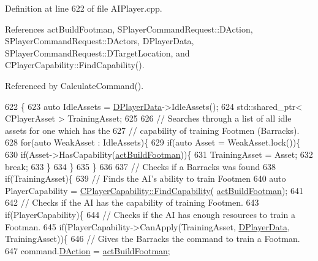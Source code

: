 Definition at line 622 of file A\+I\+Player.\+cpp.



References act\+Build\+Footman, S\+Player\+Command\+Request\+::\+D\+Action, S\+Player\+Command\+Request\+::\+D\+Actors, D\+Player\+Data, S\+Player\+Command\+Request\+::\+D\+Target\+Location, and C\+Player\+Capability\+::\+Find\+Capability().



Referenced by Calculate\+Command().


\begin{DoxyCode}
622                                                           \{
623     \textcolor{keyword}{auto} IdleAssets = \hyperlink{classCAIPlayer_a83b5113c8f7e80df54940b647c5ee2e6}{DPlayerData}->IdleAssets();
624     std::shared\_ptr< CPlayerAsset > TrainingAsset;
625     
626     \textcolor{comment}{// Searches through a list of all idle assets for one which has the }
627     \textcolor{comment}{// capability of training Footmen (Barracks).}
628     \textcolor{keywordflow}{for}(\textcolor{keyword}{auto} WeakAsset : IdleAssets)\{
629         \textcolor{keywordflow}{if}(\textcolor{keyword}{auto} Asset = WeakAsset.lock())\{
630             \textcolor{keywordflow}{if}(Asset->HasCapability(\hyperlink{GameDataTypes_8h_a35b98ce26aca678b03c6f9f76e4778cea48885d6af1b7c05c5887978f88556662}{actBuildFootman}))\{
631                 TrainingAsset = Asset;
632                 \textcolor{keywordflow}{break};
633             \}
634         \}
635     \}
636 
637     \textcolor{comment}{// Checks if a Barracks was found}
638     \textcolor{keywordflow}{if}(TrainingAsset)\{
639         \textcolor{comment}{// Finds the AI's ability to train Footmen}
640         \textcolor{keyword}{auto} PlayerCapability = \hyperlink{classCPlayerCapability_a881ba4b87385d7cfe5cb6ced2d26f226}{CPlayerCapability::FindCapability}(
      \hyperlink{GameDataTypes_8h_a35b98ce26aca678b03c6f9f76e4778cea48885d6af1b7c05c5887978f88556662}{actBuildFootman}); 
641         
642         \textcolor{comment}{// Checks if the AI has the capability of training Footmen.}
643         \textcolor{keywordflow}{if}(PlayerCapability)\{
644             \textcolor{comment}{// Checks if the AI has enough resources to train a Footman.}
645             \textcolor{keywordflow}{if}(PlayerCapability->CanApply(TrainingAsset, \hyperlink{classCAIPlayer_a83b5113c8f7e80df54940b647c5ee2e6}{DPlayerData}, TrainingAsset))\{
646                 \textcolor{comment}{// Gives the Barracks the command to train a Footman.}
647                 command.\hyperlink{structSPlayerCommandRequest_a80897bbccf2c4e0b148a7aa815a926c6}{DAction} = \hyperlink{GameDataTypes_8h_a35b98ce26aca678b03c6f9f76e4778cea48885d6af1b7c05c5887978f88556662}{actBuildFootman};

\end{DoxyCode}
